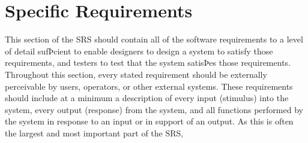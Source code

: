 \chapter{Specific Requirements}
This section of the SRS should contain all of the software requirements to a level of detail sufÞcient to enable designers to design a system to satisfy those requirements, and testers to test that the system satisÞes those requirements. 
Throughout this section, every stated requirement should be externally perceivable by users, operators, or other external systems.
These requirements should include at a minimum a description of every input (stimulus) into the system, every output (response) from the system, and all functions performed by the system in response to an input or in support of an output.
As this is often the largest and most important part of the SRS,

